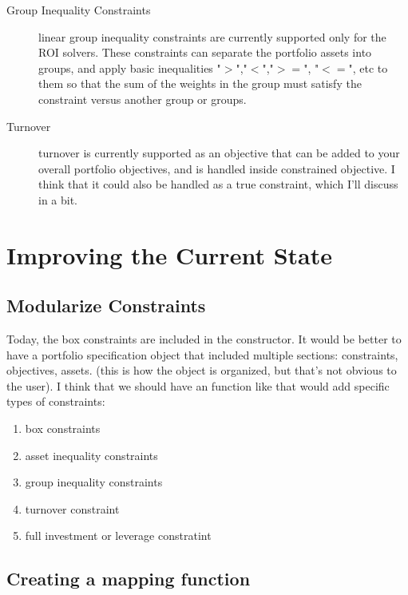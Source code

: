 \documentclass[12pt,letterpaper,english]{article}
\begin{document}
\begin{description}
\item[Group Inequality Constraints]linear group inequality constraints are currently supported only for the ROI solvers. These constraints can separate the portfolio assets into groups, and apply basic inequalities "$>$","$<$","$>=$", "$<=$", etc to them so that the sum of the weights in the group must satisfy the constraint versus another group or groups.


\item[Turnover] turnover is currently supported as an objective that can be added to your overall portfolio objectives, and is handled inside constrained objective.  I think that it could also be handled as a true constraint, which I'll discuss in a bit.

\end{description}

\section{Improving the Current State}


\subsection{Modularize Constraints}  
Today, the box constraints are included in the  constructor.  It would be better to have a portfolio specification object that included multiple sections: constraints, objectives, assets. (this is how the object is organized, but that's not obvious to the user).  I think that we should have an  function like  that would add specific types of constraints:
	\begin{enumerate}
	\item box constraints
	\item asset inequality constraints
	\item group inequality constraints
	\item turnover constraint
	\item full investment or leverage constratint
	\end{enumerate}

\subsection{Creating a mapping function}
\end{document}
